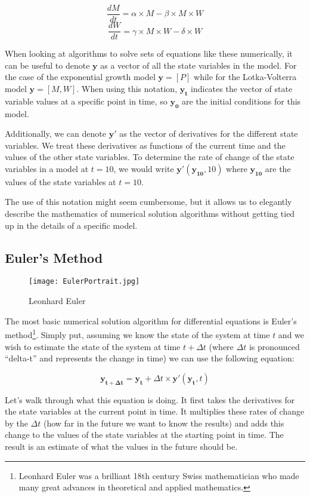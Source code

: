 \documentclass[]{memoir}
\let\Oldincludegraphics\includegraphics
\renewcommand{\includegraphics}[1]{\Oldincludegraphics[max size={\textwidth}{\textheight}]{#1}}
\begin{document}
\[ \frac{dM}{dt} = \alpha \times M - \beta \times M \times W \]
\[ \frac{dW}{dt} = \gamma \times M \times W - \delta \times W  \]

When looking at algorithms to solve sets of equations like these
numerically, it can be useful to denote $\mathbf{y}$ as a vector of all
the state variables in the model. For the case of the exponential growth
model $\mathbf{y}=[P]$ while for the Lotka-Volterra model
$\mathbf{y}=[M, W]$. When using this notation, $\mathbf{y_t}$ indicates
the vector of state variable values at a specific point in time, so
$\mathbf{y_0}$ are the initial conditions for this model.

Additionally, we can denote $\mathbf{y'}$ as the vector of derivatives
for the different state variables. We treat these derivatives as
functions of the current time and the values of the other state
variables. To determine the rate of change of the state variables in a
model at $t=10$, we would write $\mathbf{y'}(\mathbf{y_{10}}, 10)$ where
$\mathbf{y_{10}}$ are the values of the state variables at $t=10$.

The use of this notation might seem cumbersome, but it allows us to
elegantly describe the mathematics of numerical solution algorithms
without getting tied up in the details of a specific model.

\subsection{Euler's Method}

\begin{figure}[htbp]
\centering
\texttt{[image: EulerPortrait.jpg]}
\caption{Leonhard Euler}
\end{figure}

The most basic numerical solution algorithm for differential equations
is Euler's method\footnote{Leonhard Euler was a brilliant 18th century
  Swiss mathematician who made many great advances in theoretical and
  applied mathematics.}. Simply put, assuming we know the state of the
system at time $t$ and we wish to estimate the state of the system at
time $t+\Delta t$ (where $\Delta t$ is pronounced ``delta-t'' and
represents the change in time) we can use the following equation:

\[ \mathbf{y_{t+\Delta t}} = \mathbf{y_{t}} + \Delta t \times \mathbf{y'}(\mathbf{y_t}, t) \]

Let's walk through what this equation is doing. It first takes the
derivatives for the state variables at the current point in time. It
multiplies these rates of change by the $\Delta t$ (how far in the
future we want to know the results) and adds this change to the values
of the state variables at the starting point in time. The result is an
estimate of what the values in the future should be.
\end{document}
